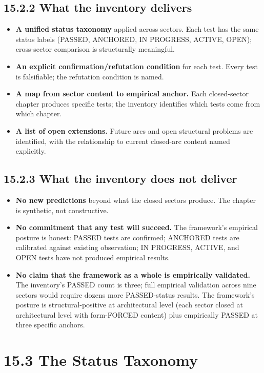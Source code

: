 \documentclass[11pt]{book}
\begin{document}
\subsection{15.2.2 What the inventory delivers}

\begin{itemize}
\item \textbf{A unified status taxonomy} applied across sectors. Each test has the same status labels (PASSED, ANCHORED, IN PROGRESS, ACTIVE, OPEN); cross-sector comparison is structurally meaningful.
\item \textbf{An explicit confirmation/refutation condition} for each test. Every test is falsifiable; the refutation condition is named.
\item \textbf{A map from sector content to empirical anchor.} Each closed-sector chapter produces specific tests; the inventory identifies which tests come from which chapter.
\item \textbf{A list of open extensions.} Future arcs and open structural problems are identified, with the relationship to current closed-arc content named explicitly.
\end{itemize}

\subsection{15.2.3 What the inventory does not deliver}

\begin{itemize}
\item \textbf{No new predictions} beyond what the closed sectors produce. The chapter is synthetic, not constructive.
\item \textbf{No commitment that any test will succeed.} The framework's empirical posture is honest: PASSED tests are confirmed; ANCHORED tests are calibrated against existing observation; IN PROGRESS, ACTIVE, and OPEN tests have not produced empirical results.
\item \textbf{No claim that the framework as a whole is empirically validated.} The inventory's PASSED count is three; full empirical validation across nine sectors would require dozens more PASSED-status results. The framework's posture is structural-positive at architectural level (each sector closed at architectural level with form-FORCED content) plus empirically PASSED at three specific anchors.
\end{itemize}

\section{15.3 The Status Taxonomy}
\end{document}
